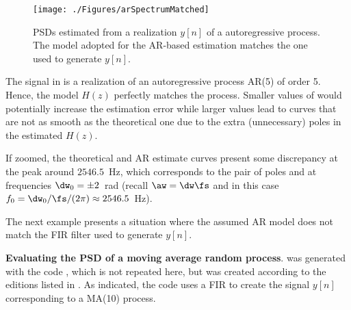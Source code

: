 
\begin{figure}[htbp]
\centering
\texttt{[image: ./Figures/arSpectrumMatched]}
\caption{PSDs estimated from a realization $y[n]$ of a autoregressive process. The model adopted for the AR-based estimation matches the one used to generate $y[n]$.\label{fig:arSpectrumMatched}}
\end{figure}

The signal  in  is a realization of an autoregressive process AR(5) of order 5. Hence, the model $H(z)$ perfectly matches the process. Smaller values of  would potentially increase the estimation error while larger values lead to curves that are not as smooth as the theoretical one due to the extra (unnecessary) poles in the estimated $H(z)$.

If zoomed, the theoretical and AR estimate curves present some discrepancy at the peak around $2546.5$~Hz, which corresponds to the pair of poles  and  at frequencies $\dw_0 = \pm 2$~rad (recall $\aw=\dw \fs$ and in this case $f_0=\dw_0/\fs/(2\pi)\approx 2546.5$~Hz).
\eExample

The next example presents a situation where the assumed AR model does not match the FIR filter used to generate $y[n]$.

\bExample \textbf{Evaluating the PSD of a moving average random process}.
 was generated with the code , which is not repeated here, but was created according to the editions listed in . As indicated, the code uses a FIR to create the signal $y[n]$ corresponding to a MA(10) process.


